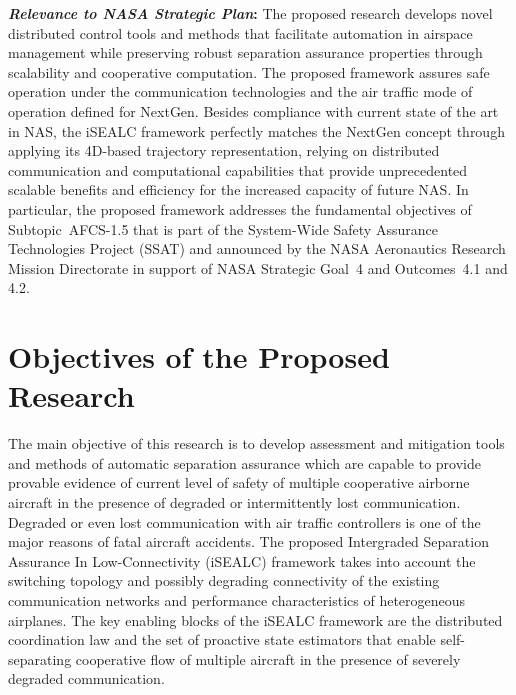 \documentclass[letter,onecolumn,12pt]{aiaa-tc}
\newcommand{\1}{1_n}
\begin{document}
\textbf{\emph{Relevance to NASA Strategic Plan}:} The proposed research develops novel distributed control tools and methods that facilitate automation in airspace management while preserving robust separation assurance properties through scalability and cooperative computation. The proposed framework  assures safe operation under the communication technologies  and the air traffic mode of operation defined for NextGen. Besides compliance with current state of the art in NAS, the iSEALC framework perfectly matches the NextGen concept through applying its 4D-based trajectory representation, relying on distributed communication and computational capabilities that provide unprecedented scalable benefits and efficiency for the increased capacity of future NAS.
In particular, the proposed framework addresses the fundamental objectives of Subtopic~\mbox{AFCS-1.5} that is part of the System-Wide Safety Assurance Technologies Project (SSAT) and announced by the NASA Aeronautics Research Mission Directorate in support of NASA Strategic Goal~4 and Outcomes~4.1 and 4.2.




\clearpage
\thispagestyle{empty}
\tableofcontents



\clearpage
\pagestyle{plain}

\section{Objectives of the Proposed Research}

The main objective of this research is to develop assessment and mitigation tools and methods of automatic separation assurance which are capable to provide provable evidence of current level of safety of multiple cooperative airborne aircraft in the presence of degraded or intermittently lost communication. Degraded or even lost communication with air traffic controllers is one of the major reasons of fatal aircraft accidents\cite{Kochenderfer_2012}. The proposed  Intergraded Separation Assurance In Low-Connectivity (iSEALC) framework takes into account the switching topology and possibly degrading connectivity of the existing communication networks and performance characteristics of heterogeneous airplanes. The key enabling blocks of the iSEALC framework are the distributed coordination law and the set of proactive state estimators that enable self-separating cooperative flow of multiple aircraft in the presence of severely degraded communication.
\end{document}
